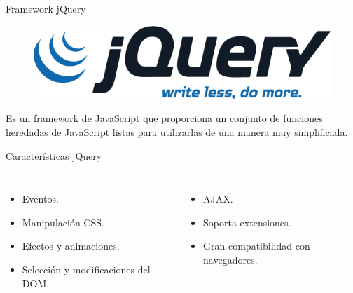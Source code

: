 \documentclass[spanish,xcolor=table,svgnames]{beamer}
\begin{document}
\begin{frame}{Framework jQuery}
\begin{figure}[]
 \includegraphics[scale=0.15]{jquery}
\end{figure}
  Es un framework de JavaScript que proporciona un conjunto de funciones heredadas de JavaScript listas para utilizarlas de una manera muy simplificada.
 \begin{block}{Características jQuery}
\begin{columns}[c]
\begin{itemize}
\item Eventos.
\item Manipulación CSS.
\item Efectos y animaciones.
\item Selección y modificaciones del DOM.
\end{itemize}
\begin{itemize}
\item AJAX.
\item Soporta extensiones.
\item Gran compatibilidad con navegadores.
\end{itemize}
\end{columns}
  \end{block}
\end{frame}
\end{document}
